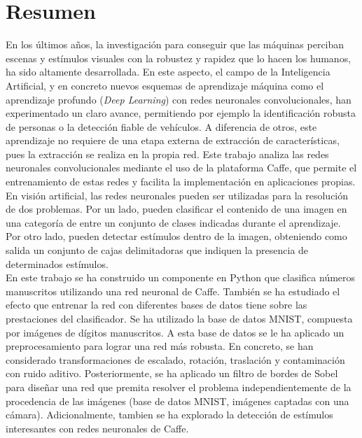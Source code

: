 \chapter*{Resumen}

En los últimos años, la investigación para conseguir que las máquinas perciban escenas y estímulos visuales con la robustez y rapidez que lo hacen los humanos, ha sido altamente desarrollada. En este aspecto, el campo de la Inteligencia Artificial, y en concreto nuevos esquemas de aprendizaje máquina como el aprendizaje profundo (\textit{Deep Learning}) con redes neuronales convolucionales, han experimentado un claro avance, permitiendo por ejemplo la identificación robusta de personas o la detección fiable de vehículos. A diferencia de otros, este aprendizaje no requiere de una etapa externa de extracción de características, pues la extracción se realiza en la propia red. Este trabajo analiza las redes neuronales convolucionales mediante el uso de la plataforma Caffe, que permite el entrenamiento de estas redes y facilita la implementación en aplicaciones propias.\\

En visión artificial, las redes neuronales pueden ser utilizadas para la resolución de dos problemas. Por un lado, pueden clasificar el contenido de una imagen en una categoría de entre un conjunto de clases indicadas durante el aprendizaje. Por otro lado, pueden detectar estímulos dentro de la imagen, obteniendo como salida un conjunto de cajas delimitadoras que indiquen la presencia de determinados estímulos.\\

En este trabajo se ha construido un componente en Python que clasifica números manuscritos utilizando una red neuronal de Caffe. También se ha estudiado el efecto que entrenar la red con diferentes bases de datos tiene sobre las prestaciones del clasificador. Se ha utilizado la base de datos MNIST, compuesta por imágenes de dígitos manuscritos. A esta base de datos se le ha aplicado un preprocesamiento para lograr una red más robusta. En concreto, se han considerado transformaciones de escalado, rotación, traslación y contaminación con ruido aditivo. Posteriormente, se ha aplicado un filtro de bordes de Sobel para diseñar una red que premita resolver el problema independientemente de la procedencia de las imágenes (base de datos MNIST, imágenes captadas con una cámara). Adicionalmente, tambien se ha explorado la detección de estímulos interesantes con redes neuronales de Caffe.